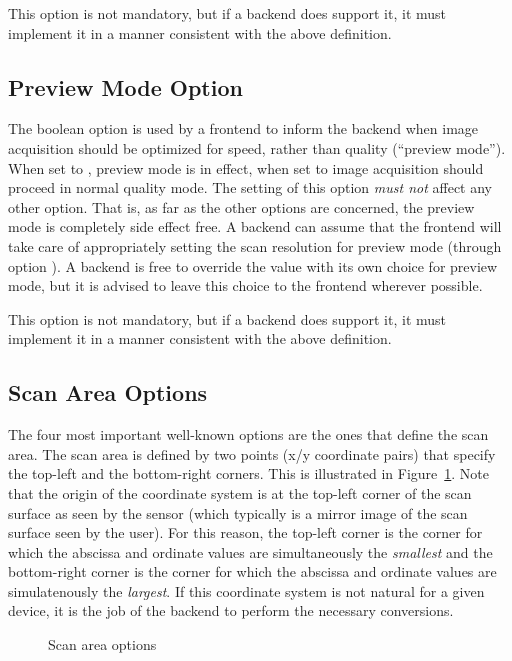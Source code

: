 \documentclass[11pt,DVIps]{report}
\begin{document}
This option is not mandatory, but if a backend does support it, it
must implement it in a manner consistent with the above definition.

\subsection{Preview Mode Option}

The boolean option  is used by a frontend to inform the
backend when image acquisition should be optimized for speed, rather
than quality (``preview mode'').  When set to ,
preview mode is in effect, when set to  image
acquisition should proceed in normal quality mode.  The setting of
this option \emph{must not\/} affect any other option.  That is, as
far as the other options are concerned, the preview mode is completely
side effect free.  A backend can assume that the frontend will take
care of appropriately setting the scan resolution for preview mode
(through option ).  A backend is free to override the
 value with its own choice for preview mode, but it
is advised to leave this choice to the frontend wherever possible.

This option is not mandatory, but if a backend does support it, it
must implement it in a manner consistent with the above definition.

\subsection{Scan Area Options}

The four most important well-known options are the ones that define
the scan area.  The scan area is defined by two points (x/y coordinate
pairs) that specify the top-left and the bottom-right corners.  This
is illustrated in Figure~\ref{fig:area}.  Note that the origin of the
coordinate system is at the top-left corner of the scan surface as
seen by the sensor (which typically is a mirror image of the scan
surface seen by the user).  For this reason, the top-left corner is
the corner for which the abscissa and ordinate values are
simultaneously the {\em smallest} and the bottom-right corner is the
corner for which the abscissa and ordinate values are simulatenously
the {\em largest}.  If this coordinate system is not natural for a
given device, it is the job of the backend to perform the necessary
conversions.
\begin{figure}[tbp]
  \begin{center}
    \leavevmode
    \caption{Scan area options}
    \label{fig:area}
  \end{center}
\end{figure}
\end{document}

